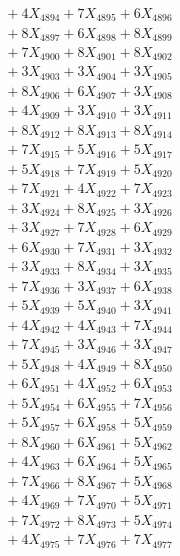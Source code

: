 \documentclass[a4paper,10pt]{article}
\begin{document}
{\begin{align}
&\;  + 4 X_{4894} + 7 X_{4895} + 6 X_{4896} \\[0.3ex]
&\;  + 8 X_{4897} + 6 X_{4898} + 8 X_{4899} \\[0.5ex]\allowbreak
&\;  + 7 X_{4900} + 8 X_{4901} + 8 X_{4902} \\[0.3ex]
&\;  + 3 X_{4903} + 3 X_{4904} + 3 X_{4905} \\[0.3ex]
&\;  + 8 X_{4906} + 6 X_{4907} + 3 X_{4908} \\[0.3ex]
&\;  + 4 X_{4909} + 3 X_{4910} + 3 X_{4911} \\[0.3ex]
&\;  + 8 X_{4912} + 8 X_{4913} + 8 X_{4914} \\[0.3ex]
&\;  + 7 X_{4915} + 5 X_{4916} + 5 X_{4917} \\[0.3ex]
&\;  + 5 X_{4918} + 7 X_{4919} + 5 X_{4920} \\[0.3ex]
&\;  + 7 X_{4921} + 4 X_{4922} + 7 X_{4923} \\[0.3ex]
&\;  + 3 X_{4924} + 8 X_{4925} + 3 X_{4926} \\[0.3ex]
&\;  + 3 X_{4927} + 7 X_{4928} + 6 X_{4929} \\[0.5ex]\allowbreak
&\;  + 6 X_{4930} + 7 X_{4931} + 3 X_{4932} \\[0.3ex]
&\;  + 3 X_{4933} + 8 X_{4934} + 3 X_{4935} \\[0.3ex]
&\;  + 7 X_{4936} + 3 X_{4937} + 6 X_{4938} \\[0.3ex]
&\;  + 5 X_{4939} + 5 X_{4940} + 3 X_{4941} \\[0.3ex]
&\;  + 4 X_{4942} + 4 X_{4943} + 7 X_{4944} \\[0.3ex]
&\;  + 7 X_{4945} + 3 X_{4946} + 3 X_{4947} \\[0.3ex]
&\;  + 5 X_{4948} + 4 X_{4949} + 8 X_{4950} \\[0.3ex]
&\;  + 6 X_{4951} + 4 X_{4952} + 6 X_{4953} \\[0.3ex]
&\;  + 5 X_{4954} + 6 X_{4955} + 7 X_{4956} \\[0.3ex]
&\;  + 5 X_{4957} + 6 X_{4958} + 5 X_{4959} \\[0.5ex]\allowbreak
&\;  + 8 X_{4960} + 6 X_{4961} + 5 X_{4962} \\[0.3ex]
&\;  + 4 X_{4963} + 6 X_{4964} + 5 X_{4965} \\[0.3ex]
&\;  + 7 X_{4966} + 8 X_{4967} + 5 X_{4968} \\[0.3ex]
&\;  + 4 X_{4969} + 7 X_{4970} + 5 X_{4971} \\[0.3ex]
&\;  + 7 X_{4972} + 8 X_{4973} + 5 X_{4974} \\[0.3ex]
&\;  + 4 X_{4975} + 7 X_{4976} + 7 X_{4977} \\[0.3ex]

\end{align}}
\end{document}
